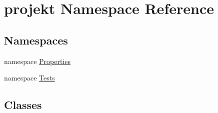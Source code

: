 \hypertarget{namespaceprojekt}{}\section{projekt Namespace Reference}
\label{namespaceprojekt}
\subsection*{Namespaces}
\begin{DoxyCompactItemize}
\item 
namespace \mbox{\hyperlink{namespaceprojekt_1_1_properties}{Properties}}
\item 
namespace \mbox{\hyperlink{namespaceprojekt_1_1_tests}{Tests}}
\end{DoxyCompactItemize}
\subsection*{Classes}
